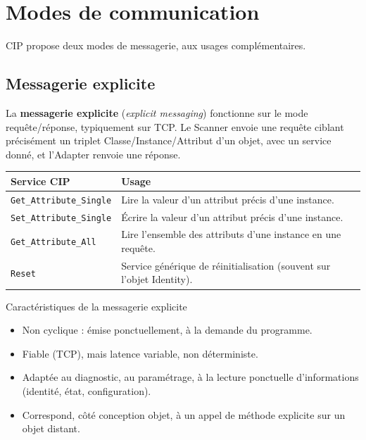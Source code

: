 \section{Modes de communication}
\label{sec:messagerie}

CIP propose deux modes de messagerie, aux usages complémentaires.

\subsection{Messagerie explicite}
La \textbf{messagerie explicite} (\emph{explicit messaging}) fonctionne sur le mode requête/réponse, typiquement sur TCP. Le Scanner envoie une requête ciblant précisément un triplet Classe/Instance/Attribut d'un objet, avec un service donné, et l'Adapter renvoie une réponse.

\begin{center}
    \begin{tabular}{|p{4cm}|p{9.5cm}|}
        \hline
        \textbf{Service CIP} & \textbf{Usage} \\
        \hline
        \texttt{Get\_Attribute\_Single} & Lire la valeur d'un attribut précis d'une instance. \\
        \hline
        \texttt{Set\_Attribute\_Single} & Écrire la valeur d'un attribut précis d'une instance. \\
        \hline
        \texttt{Get\_Attribute\_All} & Lire l'ensemble des attributs d'une instance en une requête. \\
        \hline
        \texttt{Reset} & Service générique de réinitialisation (souvent sur l'objet Identity). \\
        \hline
    \end{tabular}
\end{center}

\begin{UPSTIinfor}{Caractéristiques de la messagerie explicite}
    \begin{itemize}
        \item Non cyclique : émise ponctuellement, à la demande du programme.
        \item Fiable (TCP), mais latence variable, non déterministe.
        \item Adaptée au diagnostic, au paramétrage, à la lecture ponctuelle d'informations (identité, état, configuration).
        \item Correspond, côté conception objet, à un appel de méthode explicite sur un objet distant.
    \end{itemize}
\end{UPSTIinfor}

